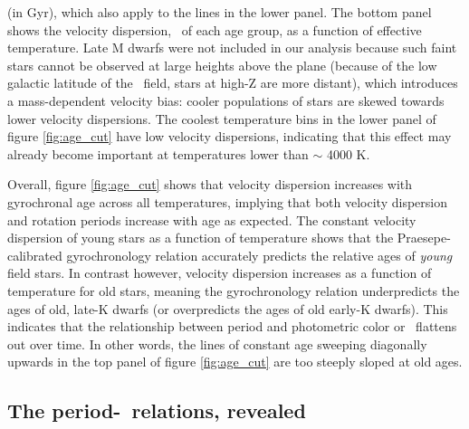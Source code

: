 (in Gyr), which also apply to the lines in the lower panel.
The bottom panel shows the velocity dispersion, \sigmavb\ of each age group,
as a function of effective temperature.
Late M dwarfs were not included in our analysis because such faint stars
cannot be observed at large heights above the plane (because of the low
galactic latitude of the \kepler\ field, stars at high-Z are more distant),
which introduces a mass-dependent velocity bias: cooler populations of stars
are skewed towards lower velocity dispersions.
The coolest temperature bins in the lower panel of figure \ref{fig:age_cut}
have low velocity dispersions, indicating that this effect may already become
important at temperatures lower than $\sim$ 4000 K.

Overall, figure \ref{fig:age_cut} shows that velocity dispersion increases
with gyrochronal age across all temperatures, implying that both velocity
dispersion and rotation periods increase with age as expected.
The constant velocity dispersion of young stars as a function of temperature
shows that the Praesepe-calibrated gyrochronology relation accurately predicts
the relative ages of {\it young} field stars.
In contrast however, velocity dispersion increases as a function of
temperature for old stars, meaning the \citet{angus2019} gyrochronology
relation underpredicts the ages of old, late-K dwarfs (or overpredicts the
ages of old early-K dwarfs).
This indicates that the relationship between period and photometric
color or \teff\ flattens out over time.
In other words, the lines of constant age sweeping diagonally upwards in the
top panel of figure \ref{fig:age_cut} are too steeply sloped at old ages.

\subsection{The period-\teff\ relations, revealed}

